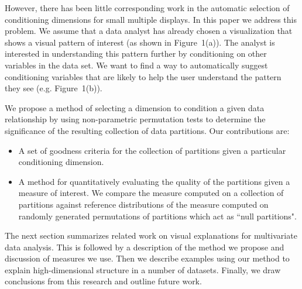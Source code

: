 However, there has been little corresponding work in the automatic selection of conditioning dimensions for small multiple displays. In this paper we address this problem.
We assume that a data analyst has already chosen a visualization that shows a visual pattern of interest (as shown in Figure~1(a)). The analyst is interested in understanding this pattern further by conditioning on other variables in the data set. We want to find a way to automatically suggest conditioning variables that are likely to help the user understand the pattern they see (e.g. Figure~1(b)). 

We propose a method of selecting a dimension to condition a given data relationship by using non-parametric permutation tests to determine the significance of the resulting collection of data partitions. Our contributions are:
\begin{itemize}
    \item A set of goodness criteria for the collection of partitions given a particular conditioning dimension.
    \item A method for quantitatively evaluating the quality of the partitions given a measure of interest. We compare the measure computed on a collection of partitions against reference distributions of the measure computed on randomly generated permutations of partitions which act as ``null partitions". 
\end{itemize}

The next section summarizes related work on visual explanations for multivariate data analysis. This is followed by a description of the method we propose and discussion of measures we use. Then we describe examples using our method to explain high-dimensional structure in a number of datasets. Finally, we draw conclusions from this research and outline future work.

